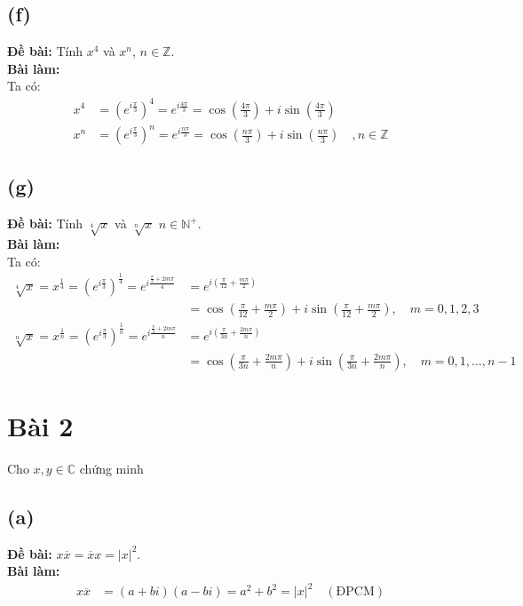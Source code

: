 \subsection{(f)}
\textbf{Đề bài:} Tính $x^{4}$ và $x^{n}$, $n\in\mathbb{Z}$.\\
\textbf{Bài làm:}\\
Ta có:
\begin{align*}
    x^{4} & = \left(e^{i\frac{\pi}{3}}\right)^4 = e^{i\frac{4\pi}{3}} = \cos\left(\frac{4\pi}{3}\right) + i\sin\left(\frac{4\pi}{3}\right) \\
    x^{n} & = \left(e^{i\frac{\pi}{3}}\right)^{n} = e^{i\frac{n\pi}{3}} = \cos\left(\frac{n\pi}{3}\right) + i\sin\left(\frac{n\pi}{3}\right) \quad, n\in\mathbb{Z}
\end{align*}

\subsection{(g)}
\textbf{Đề bài:} Tính $\sqrt[4]{x}$ và $\sqrt[n]{x}$ $n\in\mathbb{N}^{+}$.\\
\textbf{Bài làm:}\\
Ta có:
\begin{align*}
    \sqrt[4]{x} = x^{\frac{1}{4}} = \left(e^{i\frac{\pi}{3}}\right)^{\frac{1}{4}} = e^{i\frac{\frac{\pi}{3} + 2m\pi}{4}} &= e^{i\left(\frac{\pi}{12} + \frac{m\pi}{2}\right)} \\&= \cos\left(\frac{\pi}{12} + \frac{m\pi}{2}\right) + i\sin\left(\frac{\pi}{12} + \frac{m\pi}{2}\right), \quad m = 0, 1, 2, 3 \\
    \sqrt[n]{x} = x^{\frac{1}{n}} = \left(e^{i\frac{\pi}{3}}\right)^{\frac{1}{n}} = e^{i\frac{\frac{\pi}{3} + 2m\pi}{n}} &= e^{i\left(\frac{\pi}{3n} + \frac{2m\pi}{n}\right)} \\&= \cos\left(\frac{\pi}{3n} + \frac{2m\pi}{n}\right) + i\sin\left(\frac{\pi}{3n} + \frac{2m\pi}{n}\right), \quad m = 0, 1, \dots, n-1
\end{align*}

\section{Bài 2}
Cho $x, y\in\mathbb{C}$ chứng minh

\subsection{(a)}
\textbf{Đề bài:} $x\overline{x}=\overline{x}x=|x|^{2}$.\\
\textbf{Bài làm:}
\begin{align*}
    x \overline{x} & = (a + bi)(a - bi) = a^{2} + b^{2} = |x|^{2} \quad (\text{ĐPCM}) \\
\end{align*}

